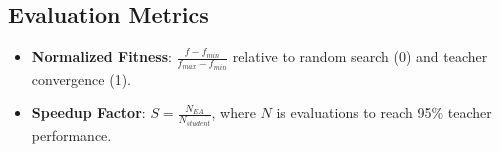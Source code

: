 \documentclass{article}
\begin{document}
\subsection{Evaluation Metrics}
\begin{itemize}
    \item \textbf{Normalized Fitness}: $\frac{f - f_{min}}{f_{max} - f_{min}}$ relative to random search (0) and teacher convergence (1).
    \item \textbf{Speedup Factor}: $S = \frac{N_{EA}}{N_{student}}$, where $N$ is evaluations to reach 95\% teacher performance.
\end{itemize}
\end{document}
